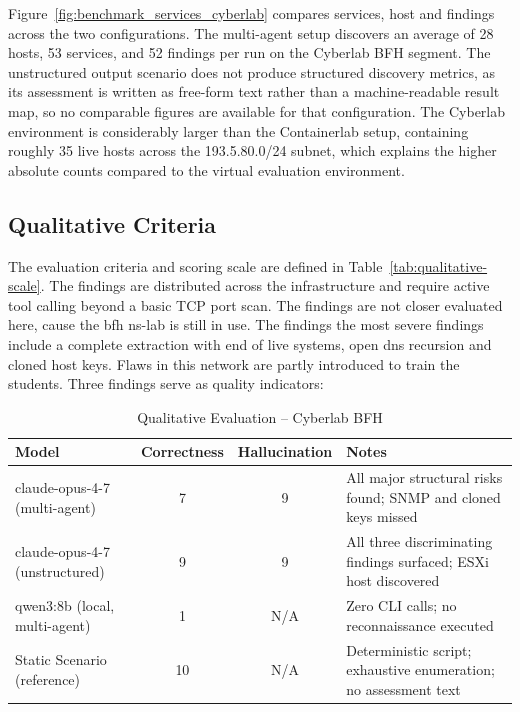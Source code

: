 Figure~\ref{fig:benchmark_services_cyberlab} compares services, host and findings across the two
configurations.
The multi-agent setup discovers an average of 28 hosts, 53 services, and 52 findings per
run on the Cyberlab BFH segment.
The unstructured output scenario does not produce structured discovery metrics, as its
assessment is written as free-form text rather than a machine-readable result map, so no
comparable figures are available for that configuration.
The Cyberlab environment is considerably larger than the Containerlab setup, containing
roughly 35 live hosts across the 193.5.80.0/24 subnet, which explains the higher absolute
counts compared to the virtual evaluation environment.

\subsection{Qualitative Criteria}\label{subsec:qualitativ-criteria-cyberlab}

The evaluation criteria and scoring scale are defined in Table~\ref{tab:qualitative-scale}.
The findings are distributed across the infrastructure and require
active tool calling beyond a basic TCP port scan.
The findings are not closer evaluated here, cause the bfh ns-lab is still in use.
The findings the most severe findings include a complete extraction with end of live systems, open dns recursion and
cloned host keys.
Flaws in this network are partly introduced to train the students.
Three findings serve as quality indicators:

\begin{table}[h]
\centering
\caption{Qualitative Evaluation -- Cyberlab BFH}
\label{tab:qualitative-results-cyberlab-bfh}
\small
\begin{tabular}{@{}lccl@{}}
\toprule
\textbf{Model} & \textbf{Correctness} & \textbf{Hallucination} & \textbf{Notes} \\
\midrule
claude-opus-4-7 (multi-agent)       & 7 & 9 & All major structural risks found; SNMP and cloned keys missed \\
claude-opus-4-7 (unstructured)      & 9 & 9 & All three discriminating findings surfaced; ESXi host discovered \\
qwen3:8b (local, multi-agent)       & 1 & N/A & Zero CLI calls; no reconnaissance executed \\
Static Scenario (reference)         & 10 & N/A & Deterministic script; exhaustive enumeration; no assessment text \\
\bottomrule
\end{tabular}
\end{table}

